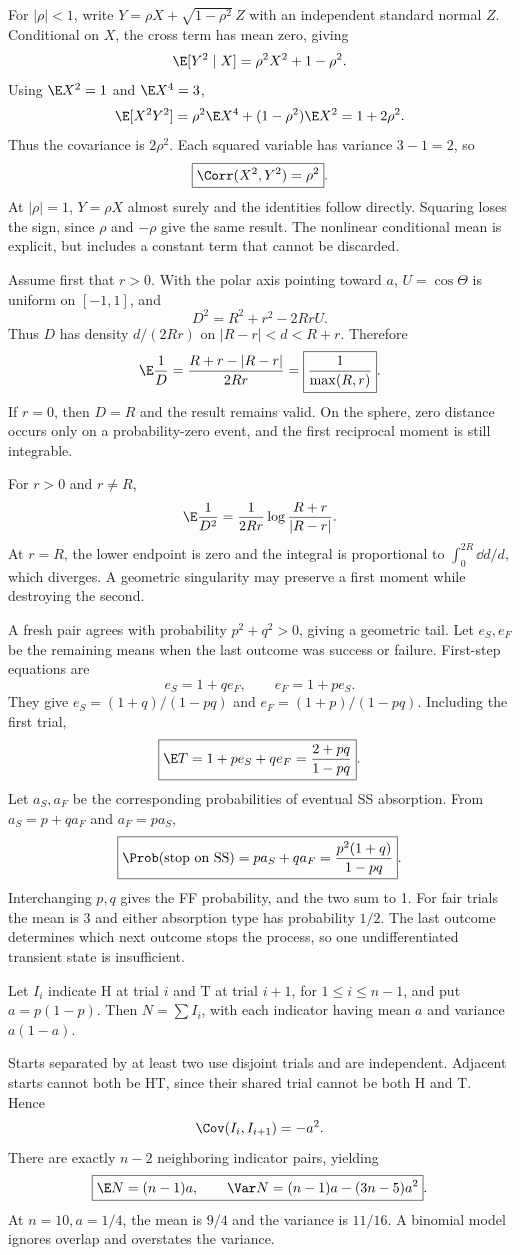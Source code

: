 For $|\rho|<1$, write $Y=\rho X+\sqrt{1-\rho^2}\,Z$ with an independent standard normal $Z$. Conditional on $X$, the cross term has mean zero, giving
\[
\E[Y^2\mid X]=\rho^2X^2+1-\rho^2.
\]
Using $\E X^2=1$ and $\E X^4=3$,
\[
\E[X^2Y^2]=\rho^2\E X^4+(1-\rho^2)\E X^2
=1+2\rho^2.
\]
Thus the covariance is $2\rho^2$. Each squared variable has variance $3-1=2$, so
\[
\boxed{\Corr(X^2,Y^2)=\rho^2}.
\]
At $|\rho|=1$, $Y=\rho X$ almost surely and the identities follow directly. Squaring loses the sign, since $\rho$ and $-\rho$ give the same result. The nonlinear conditional mean is explicit, but includes a constant term that cannot be discarded.

Assume first that $r>0$. With the polar axis pointing toward $a$, $U=\cos\Theta$ is uniform on $[-1,1]$, and
\[
D^2=R^2+r^2-2RrU.
\]
Thus $D$ has density $d/(2Rr)$ on $|R-r|<d<R+r$. Therefore
\[
\E\frac1D=\frac{R+r-|R-r|}{2Rr}
=\boxed{\frac1{\max(R,r)}}.
\]
If $r=0$, then $D=R$ and the result remains valid. On the sphere, zero distance occurs only on a probability-zero event, and the first reciprocal moment is still integrable.

For $r>0$ and $r\ne R$,
\[
\E\frac1{D^2}
=\frac1{2Rr}\log\frac{R+r}{|R-r|}.
\]
At $r=R$, the lower endpoint is zero and the integral is proportional to $\int_0^{2R}\dd d/d$, which diverges. A geometric singularity may preserve a first moment while destroying the second.

A fresh pair agrees with probability $p^2+q^2>0$, giving a geometric tail. Let $e_S,e_F$ be the remaining means when the last outcome was success or failure. First-step equations are
\[
e_S=1+qe_F,\qquad e_F=1+pe_S.
\]
They give $e_S=(1+q)/(1-pq)$ and $e_F=(1+p)/(1-pq)$. Including the first trial,
\[
\boxed{\E T=1+pe_S+qe_F=\frac{2+pq}{1-pq}}.
\]
Let $a_S,a_F$ be the corresponding probabilities of eventual SS absorption. From $a_S=p+qa_F$ and $a_F=pa_S$,
\[
\boxed{\Prob(\text{stop on SS})
=pa_S+qa_F=\frac{p^2(1+q)}{1-pq}}.
\]
Interchanging $p,q$ gives the FF probability, and the two sum to 1. For fair trials the mean is 3 and either absorption type has probability $1/2$. The last outcome determines which next outcome stops the process, so one undifferentiated transient state is insufficient.

Let $I_i$ indicate H at trial $i$ and T at trial $i+1$, for $1\le i\le n-1$, and put $a=p(1-p)$. Then $N=\sum I_i$, with each indicator having mean $a$ and variance $a(1-a)$.

Starts separated by at least two use disjoint trials and are independent. Adjacent starts cannot both be HT, since their shared trial cannot be both H and T. Hence
\[
\Cov(I_i,I_{i+1})=-a^2.
\]
There are exactly $n-2$ neighboring indicator pairs, yielding
\[
\boxed{\E N=(n-1)a,\qquad
\Var N=(n-1)a-(3n-5)a^2}.
\]
At $n=10,a=1/4$, the mean is $9/4$ and the variance is $11/16$. A binomial model ignores overlap and overstates the variance.

